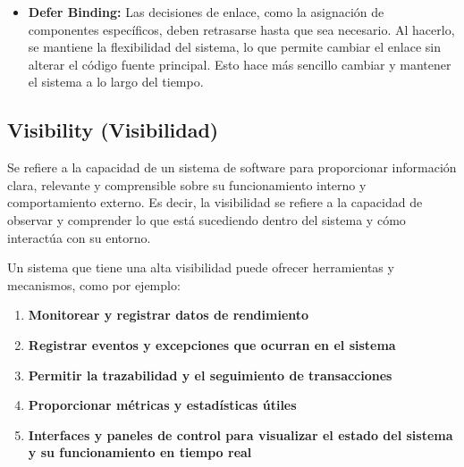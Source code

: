 \documentclass{article}
\begin{document}
\begin{itemize}
\begin{enumerate}
				\item \textbf{Abstract common services}: Al proporcionar servicios comunes como abstracciones, se mejora la adaptabilidad del sistema al modificar la implementación interna de los servicios sin afectar los módulos que los utilizan.
				
			\end{enumerate}	
						\item \textbf{Defer Binding:}
						Las decisiones de enlace, como la asignación de componentes específicos, deben retrasarse hasta que sea necesario. Al hacerlo, se mantiene la flexibilidad del sistema, lo que permite cambiar el enlace sin alterar el código fuente principal. Esto hace más sencillo cambiar y mantener el sistema a lo largo del tiempo.
				
		\end{itemize}
		
		\subsection{Visibility \small{(Visibilidad)} }\label{sec:visibilidad}
		Se refiere a la capacidad de un sistema de software para proporcionar información clara, relevante y comprensible sobre su funcionamiento interno y comportamiento externo. Es decir, la visibilidad se refiere a la capacidad de observar y comprender lo que está sucediendo dentro del sistema y cómo interactúa con su entorno.
		
		Un sistema que tiene una alta visibilidad puede ofrecer herramientas y mecanismos, como por ejemplo: 
		
		\begin{enumerate}
			\item \textbf{Monitorear y registrar datos de rendimiento}
			
			\item \textbf{Registrar eventos y excepciones que ocurran en el sistema}
			
			\item \textbf{Permitir la trazabilidad y el seguimiento de transacciones}
			
			\item \textbf{Proporcionar métricas y estadísticas útiles}
			
			\item \textbf{Interfaces y paneles de control para visualizar el estado del sistema y su funcionamiento en tiempo real}
			
		\end{enumerate}	
		
\end{document}
